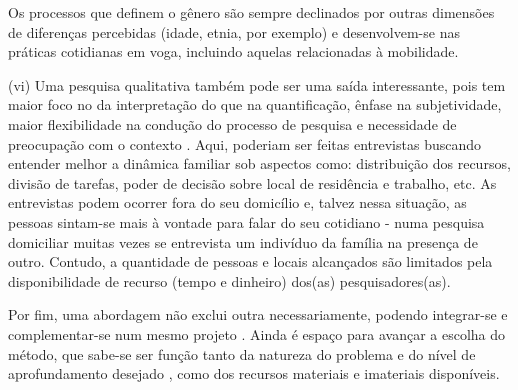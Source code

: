 \begin{citacao}
Os processos que definem o gênero são sempre declinados  por outras dimensões de diferenças percebidas (idade, etnia, por exemplo) e desenvolvem-se nas práticas cotidianas em voga, incluindo aquelas relacionadas à mobilidade.
\end{citacao}

(vi) Uma pesquisa qualitativa também pode ser uma saída interessante, pois tem maior foco no da interpretação do que na quantificação, ênfase na subjetividade, maior flexibilidade na condução do processo de pesquisa e necessidade de preocupação com o contexto \cite{CASELL1994}. Aqui, poderiam ser feitas entrevistas buscando entender melhor a dinâmica familiar sob aspectos como: distribuição dos recursos, divisão de tarefas, poder de decisão sobre local de residência e trabalho, etc. As entrevistas podem ocorrer fora do seu domicílio e, talvez nessa situação, as pessoas sintam-se mais à vontade para falar do seu cotidiano - numa pesquisa domiciliar muitas vezes se entrevista um indivíduo da família na presença de outro. Contudo, a quantidade de pessoas e locais alcançados são limitados pela disponibilidade de recurso (tempo e dinheiro) dos(as) pesquisadores(as). 

Por fim, uma abordagem não exclui outra necessariamente, podendo integrar-se e complementar-se num mesmo projeto \cite{MINAYO1996}. Ainda é espaço para avançar a escolha do método, que sabe-se ser função tanto da natureza do problema e do nível de aprofundamento desejado \cite{DIEHL2004}, como dos recursos materiais e imateriais disponíveis.



